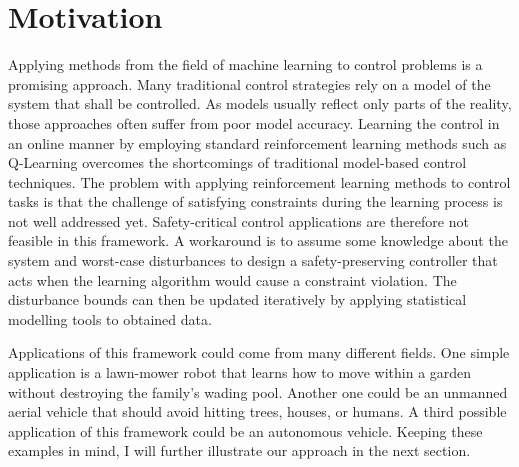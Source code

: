 \documentclass[../main.tex]{subfiles}
\begin{document}
\section{Motivation}
Applying methods from the field of machine learning to control problems is a promising approach. Many traditional control strategies rely on a model of the system that shall be controlled. As models usually reflect only parts of the reality, those approaches often suffer from poor model accuracy. Learning the control in an online manner by employing standard reinforcement learning methods such as Q-Learning overcomes the shortcomings of traditional model-based control techniques. The problem with applying reinforcement learning methods to control tasks is that the challenge of satisfying constraints during the learning process is not well addressed yet. Safety-critical control applications are therefore not feasible in this framework. A workaround is to assume some knowledge about the system and worst-case disturbances to design a safety-preserving controller that acts when the learning algorithm would cause a constraint violation. The disturbance bounds can then be updated iteratively by applying statistical modelling tools to obtained data. \par
Applications of this framework could come from many different fields. One simple application is a lawn-mower robot that learns how to move within a garden without destroying the family's wading pool. Another one could be an unmanned aerial vehicle that should avoid hitting trees, houses, or humans. A third possible application of this framework could be an autonomous vehicle. Keeping these examples in mind, I will further illustrate our approach in the next section.
\end{document}
